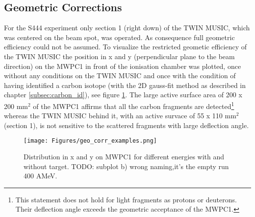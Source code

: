 \subsection{Geometric Corrections}\label{sec:geo_corr}
For the S444 experiment only section 1 (right down) of the TWIN MUSIC, which was centered on the beam spot, was operated. As consequence full geometric efficiency could not be assumed. To visualize the restricted geometic efficiency of the TWIN MUSIC the position in x and y (perpendicular plane to the beam direction) on the MWPC1 in front of the ionisation chamber was plotted, once without any conditions on the TWIN MUSIC and once with the condition of having identified a carbon isotope (with the 2D gauss-fit method as described in chapter \ref{subsec:carbon_id}), see figure \ref{fig:mw1_xy}. The large active surface area of 200 x 200 mm$^{2}$ of the MWPC1 affirms that all the carbon fragments are detected\footnote{This statement does not hold for light fragments as protons or deuterons. Their deflection angle exceeds the geometric acceptance of the MWPC1.} whereas the TWIN MUSIC behind it, with an active survace of 55 x 110 mm$^{2}$ (section 1), is not sensitive to the scattered fragments with large deflection angle.\newline
\begin{figure}[htpb]
    \centering
    \texttt{[image: Figures/geo\_corr\_examples.png]}
    \caption{
    Distribution in x and y on MWPC1 for different energies with and without target. TODO: subplot b) wrong naming,it's the empty run 400 AMeV. 
     }
    \label{fig:mw1_xy}
\end{figure}

